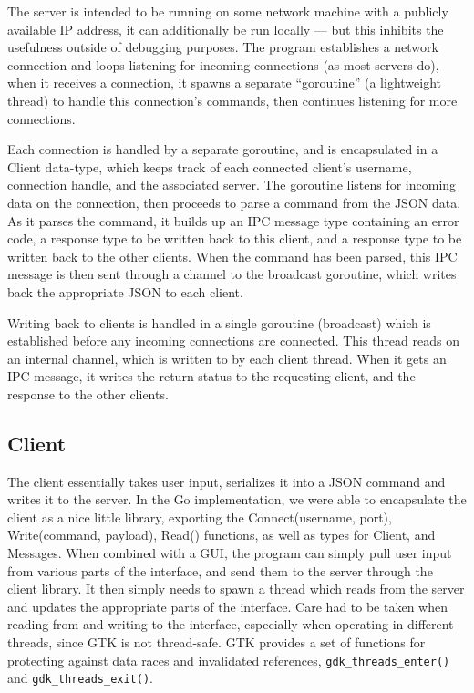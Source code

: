 \documentclass[12pt, letterpaper]{article}
\begin{document}
The server is intended to be running on some network machine with a
publicly available IP address, it can additionally be run locally ---
but this inhibits the usefulness outside of debugging purposes. The
program establishes a network connection and loops listening for
incoming connections (as most servers do), when it receives a
connection, it spawns a separate ``goroutine'' (a lightweight thread)
to handle this connection's commands, then continues listening for more
connections.

Each connection is handled by a separate goroutine, and is encapsulated
in a Client data-type, which keeps track of each connected client's
username, connection handle, and the associated server. The goroutine
listens for incoming data on the connection, then proceeds to parse a
command from the JSON data. As it parses the command, it builds up an
IPC message type containing an error code, a response type to be
written back to this client, and a response type to be written back to
the other clients. When the command has been parsed, this IPC message
is then sent through a channel to the broadcast goroutine, which writes
back the appropriate JSON to each client.

Writing back to clients is handled in a single goroutine (broadcast)
which is established before any incoming connections are connected.
This thread reads on an internal channel, which is written to by each
client thread. When it gets an IPC message, it writes the return status
to the requesting client, and the response to the other clients.

\subsection*{Client}

The client essentially takes user input, serializes it into a JSON
command and writes it to the server. In the Go implementation, we were
able to encapsulate the client as a nice little library, exporting the
Connect(username, port), Write(command, payload), Read() functions, as
well as types for Client, and Messages. When combined with a GUI, the
program can simply pull user input from various parts of the interface,
and send them to the server through the client library. It then simply
needs to spawn a thread which reads from the server and updates the
appropriate parts of the interface. Care had to be taken when reading
from and writing to the interface, especially when operating in
different threads, since GTK is not thread-safe. GTK provides a set of
functions for protecting against data races and invalidated references,
\verb+gdk_threads_enter()+ and \verb+gdk_threads_exit()+.
\end{document}
